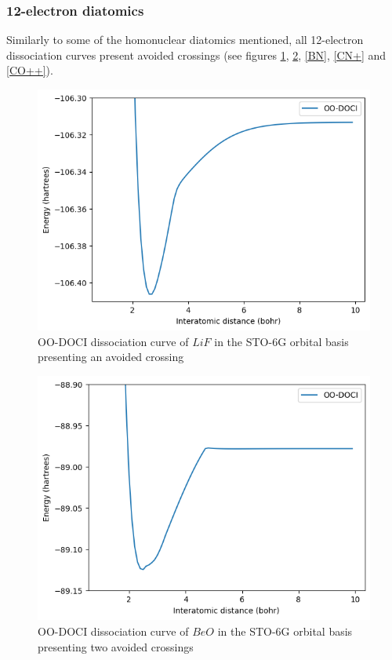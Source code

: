 \documentclass[twoside,twocolumn,9pt]{article}
\begin{document}
\subsubsection{12-electron diatomics}

Similarly to some of the homonuclear diatomics mentioned, all 12-electron dissociation curves present avoided crossings (see figures \ref{LiF}, \ref{BeO}, \ref{BN}, \ref{CN+} and \ref{CO++}).

\begin{figure}
  \includegraphics[width=\linewidth]{LiF.png}
  \caption{OO-DOCI dissociation curve of $LiF$ in the STO-6G orbital basis presenting an avoided crossing}\label{LiF}
\end{figure}

\begin{figure}
  \includegraphics[width=\linewidth]{BeO.png}
  \caption{OO-DOCI dissociation curve of $BeO$ in the STO-6G orbital basis presenting two avoided crossings}\label{BeO}
\end{figure}
\end{document}
